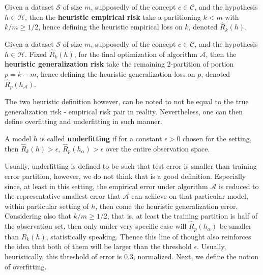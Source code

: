 \documentclass[10pt,oneside,oldfontcommands,dvipsnames,article]{memoir}
\begin{document}
\begin{definition}
  Given a dataset $\mathcal{S}$ of size $m$, supposedly of the concept $c\in \mathcal{C}$, and the hypothesis $h\in \mathcal{H}$, then the \textbf{heuristic empirical risk} take a partitioning $k<m$ with $k/m\geq 1/2$, hence defining the heuristic empirical loss on $k$, denoted $\hat{R}_{k}(h)$. 
\end{definition}

\begin{definition}
  Given a dataset $\mathcal{S}$ of size $m$, supposedly of the concept $c\in \mathcal{C}$, and the hypothesis $h\in \mathcal{H}$. Fixed $\hat{R}_{k}(h)$, for the final optimization of algorithm $\mathcal{A}$, then the \textbf{heuristic generalization risk} take the remaining 2-partition of portion $p=k-m$, hence defining the heuristic generalization loss on $p$, denoted $\hat{R}_{p}(h_{\mathcal{A}})$. 
\end{definition}
The two heuristic definition however, can be noted to not be equal to the true generalization risk - empirical risk pair in reality. Nevertheless, one can then define overfitting and underfitting in such manner. 
\begin{definition}[Underfitting]
  A model $h$ is called \textbf{underfitting} if for a constant $\epsilon > 0$ chosen for the setting, then $\hat{R}_{k}(h)>\epsilon$, $\hat{R}_{p}(h_{\alpha})> \epsilon$ over the entire observation space. 
\end{definition}
Usually, underfitting is defined to be such that test error is smaller than training error partition, however, we do not think that is a good definition. Especially since, at least in this setting, the empirical error under algorithm $\mathcal{A}$ is reduced to the representative smallest error that $\mathcal{A}$ can achieve on that particular model, within particular setting of $h$, then come the heuristic generalization error. Considering also that $k/m\geq 1/2$, that is, at least the training partition is half of the observation set, then only under very specific case will $\hat{R}_{p}(h_{\alpha})$ be smaller than $\hat{R}_{k}(h)$, statistically speaking. Thence this line of thought also reinforces the idea that both of them will be larger than the threshold $\epsilon$. Usually, heuristically, this threshold of error is $0.3$, normalized. Next, we define the notion of overfitting. 
\end{document}
